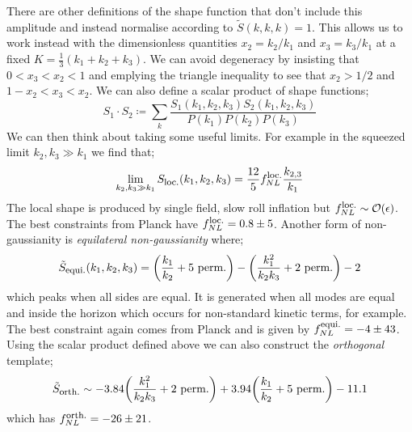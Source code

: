 There are other definitions of the shape function that don't include this amplitude and instead normalise according to $\tilde{S}(k, k, k) = 1$. This allows us to work instead with the dimensionless quantities $x_2 = k_2 / k_1$ and $x_3 = k_3 / k_1$ at a fixed $K = \tfrac{1}{3}(k_1 + k_2 + k_3)$. We can avoid degeneracy by insisting that $0 < x_3 < x_2 < 1$ and emplying the triangle inequality to see that $x_2 > 1/2$ and $1 - x_2 < x_3 < x_2$. We can also define a scalar product of shape functions;
\begin{equation*}
S_1 \cdot S_2 \coloneqq \sum_{k}{\frac{S_1(k_1, k_2, k_3) S_2(k_1, k_2, k_3)}{P(k_1)P(k_2)P(k_3)}}
\end{equation*}
We can then think about taking some useful limits. For example in the squeezed limit $k_2, k_3 \gg k_1$ we find that;
\begin{equation*}
\lim_{k_2, k_3 \gg k_1}S_{\text{\footnotesize{loc.}}}(k_1, k_2, k_3) = \frac{12}{5}f_{NL}^{\text{\footnotesize{loc.}}} \frac{k_{2, 3}}{k_1}
\end{equation*}
The local shape is produced by single field, slow roll inflation but $f_{NL}^{\text{\footnotesize{loc.}}} \sim \mathcal{O}(\epsilon)$. The best constraints from Planck have $f_{NL}^{\text{\footnotesize{loc.}}} = 0.8 \pm 5$. Another form of non-gaussianity is \emph{equilateral non-gaussianity} where;
\begin{equation*}
\tilde{S}_{\text{\footnotesize{equi.}}}(k_1, k_2, k_3) = \left(\frac{k_1}{k_2} + \text{5 perm.}\right) - \left(\frac{k_1^2}{k_2 k_3} + \text{2 perm.}\right) - 2
\end{equation*} 
which peaks when all sides are equal. It is generated when all modes are equal and inside the horizon which occurs for non-standard kinetic terms, for example. The best constraint again comes from Planck and is given by $f_{NL}^{\text{\footnotesize{equi.}}} = -4 \pm 43$. Using the scalar product defined above we can also construct the \emph{orthogonal} template;
\begin{equation*}
\tilde{S}_{\text{\footnotesize{orth.}}} \sim -3.84\left(\frac{k_1^2}{k_2 k_3} + \text{2 perm.}\right) + 3.94\left(\frac{k_1}{k_2} + \text{5 perm.}\right) - 11.1
\end{equation*}
which has $f_{NL}^{\text{\footnotesize{orth.}}} = -26 \pm 21$.
